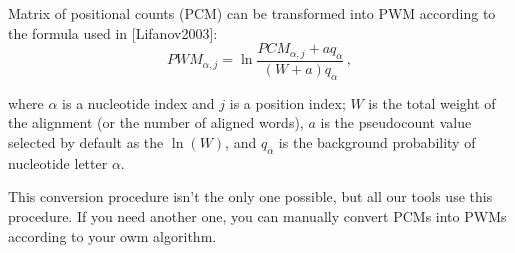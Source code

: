 Matrix of positional counts (PCM) can be transformed into PWM according to the formula used in [Lifanov2003]:
\begin{equation}PWM_{\alpha,j} = \ln\frac{ PCM_{\alpha,j} + aq_{\alpha} }{ (W+a)q_{\alpha} }\,, \end{equation}

where $\alpha$ is a nucleotide index and $j$ is a position index; $W$ is the total weight of the alignment (or the number of aligned words), $a$ is the 
pseudocount value selected by default as the $\ln(W)$, and $q_{\alpha}$ is the background probability of nucleotide letter $\alpha$.

This conversion procedure isn't the only one possible, but all our tools use this procedure. If you need another one, you can manually convert PCMs into PWMs according to your owm algorithm.
